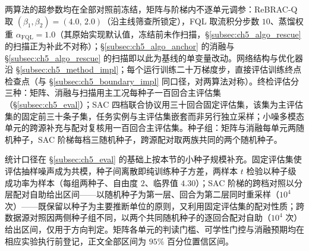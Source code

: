 两算法的超参数均在全部对照前冻结，矩阵与阶梯内不逐单元调参：ReBRAC-Q 取 $(\beta_1,\beta_2)=(4.0,\,2.0)$（沿主线筛查所锁定），FQL 取流积分步数 $10$、蒸馏权重 $\alpha_{\mathrm{FQL}}=1.0$（其原始实现默认值，冻结前未作扫描，\S\ref{subsec:ch5_algo_rescue} 的扫描正为补此不对称）；\S\ref{subsec:ch5_algo_anchor} 的消融与 \S\ref{subsec:ch5_algo_rescue} 的扫描即以此为基线的单变量改动。网络结构与优化器沿 \S\ref{subsec:ch5_method_impl}；每个运行训练二十万梯度步，直接评估训练终点检查点（与 \S\ref{subsec:ch5_boundary_impl} 同口径，对两算法对称）。终检评估分三种：矩阵、消融与扫描用主工况每种子一百回合主评估集（\S\ref{subsec:ch5_eval}）；SAC 四档联合协议用三十回合固定评估集，该集为主评估集的固定前三十条子集，任务实例与主评估集嵌套而非另行独立采样；小噪多模态单元的跨源补充与配对复核用一百回合主评估集。种子组：矩阵与消融每单元两随机种子，SAC 阶梯每档三随机种子，跨源配对取两族共同的两个随机种子。

统计口径在 \S\ref{subsec:ch5_eval} 的基础上按本节的小种子规模补充。固定评估集使评估抽样噪声成为共模，种子间离散即纯训练种子方差，两样本 $t$ 检验以种子级成功率为样本（每组两种子、自由度 $2$、临界值 $4.30$）；SAC 阶梯的跨档对照以分层配对自助给出区间——以随机种子为第一层、回合为第二层同时重采样（$10^4$ 次）——既保留以种子为主要推断单位的原则，又利用固定评估集的配对性质；跨数据源对照因两侧种子组不同，以两个共同随机种子的逐回合配对自助（$10^4$ 次）给出区间，仅用于方向判定。矩阵各单元的判读门槛、可学性门控与消融预期均在相应实验执行前登记，正文全部区间为 $95\%$ 百分位置信区间。
